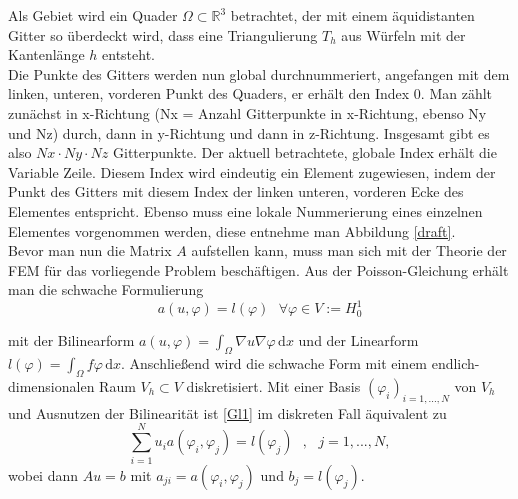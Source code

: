 Als Gebiet wird ein Quader $\Omega \subset \mathbb{R}^{3}$ betrachtet, der mit einem äquidistanten Gitter so überdeckt wird, dass eine Triangulierung $T_h$ aus Würfeln mit der Kantenlänge $h$ entsteht. \\
Die Punkte des Gitters werden nun global durchnummeriert, angefangen mit dem linken, unteren, vorderen Punkt des Quaders, er erhält den Index 0. Man zählt zunächst in x-Richtung (Nx = Anzahl Gitterpunkte in x-Richtung, ebenso Ny und Nz) durch, dann in y-Richtung und dann in z-Richtung. Insgesamt gibt es also $Nx \cdot Ny \cdot Nz$ Gitterpunkte. Der aktuell betrachtete, globale Index erhält die Variable \glqq Zeile\grqq. Diesem Index wird eindeutig ein Element zugewiesen, indem der Punkt des Gitters mit diesem Index der linken unteren, vorderen Ecke des Elementes entspricht. Ebenso muss eine lokale Nummerierung eines einzelnen Elementes vorgenommen werden, diese entnehme man Abbildung \ref{draft}.\\

Bevor man nun die Matrix $A$ aufstellen kann, muss man sich mit der Theorie der FEM für das vorliegende Problem beschäftigen. 
Aus der Poisson-Gleichung erhält man die schwache Formulierung 
\begin{equation}
a(u, \varphi)=l( \varphi) \text{ } \forall \varphi \in V:=H^1_0 
\end{equation} \label{Gl1}


mit der Bilinearform $a(u, \varphi)=\int_\Omega \! \nabla u \nabla \varphi \, \mathrm{d}x $ und der Linearform $l( \varphi)= \int_\Omega \! f \varphi \, \mathrm{d}x $. Anschließend wird die schwache Form mit einem endlich-dimensionalen Raum $V_h \subset V$ diskretisiert. Mit einer Basis $(\varphi_i)_{i=1,...,N}$ von $V_h$ und Ausnutzen der Bilinearität ist \eqref{Gl1} im diskreten Fall äquivalent zu 
\begin{equation}
\sum_{i=1}^N u_i a(\varphi_i, \varphi_j)=l(\varphi_j) \text{ } , \text{ } j = 1,...,N,
\end{equation}
wobei dann $A u = b$ mit $a_{ji}=a(\varphi_i, \varphi_j)$ und $b_j=l(\varphi_j)$. \\

